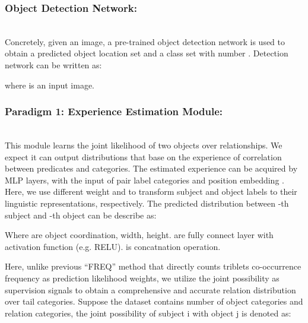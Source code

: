 \documentclass[runningheads]{llncs}
\begin{document}
\subsubsection{Object Detection Network:}~\\
Concretely, given an image, a pre-trained object detection network is used to
obtain a predicted object location set  and a class set  with number .  Detection network can be written as:

where  is an input image.
\subsubsection{Paradigm 1: Experience Estimation Module:}~\\
This module learns the joint likelihood of two objects over relationships. We
expect it can output distributions that base on the experience of correlation
between predicates and categories. The estimated experience can be acquired by
MLP layers, with the input of pair label categories  and position
embedding . Here, we use different weight  and  to
transform subject and object labels to their linguistic representations,
respectively. The predicted distribution between -th subject and -th
object  can be describe as:

Where  are object coordination, width, height.
 are fully connect layer with activation
function (e.g. RELU).  is concatnation operation.

Here, unlike previous ``FREQ''\cite{motif} method that directly counts triblets
 co-occurrence frequency as prediction
likelihood weights, we utilize the joint possibility as supervision signals to
obtain a comprehensive and accurate relation distribution over tail categories.
Suppose the dataset contains  number of object categories and  
relation categories, the joint possibility of subject i with object j is
denoted as:
\end{document}
